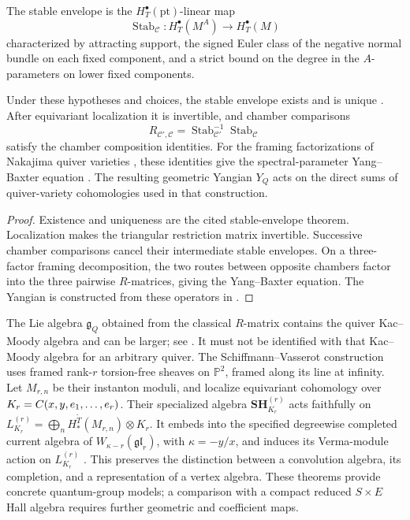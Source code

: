 \begin{definition}
\label{def:stable-envelope}
The stable envelope is the $H_T^\bullet(\mathrm{pt})$-linear map
\[
 \operatorname{Stab}_{\mathcal C}:
 H_T^\bullet(M^A)\longrightarrow H_T^\bullet(M)
\]
characterized by attracting support, the signed Euler class of the
negative normal bundle on each fixed component, and a strict bound
on the degree in the $A$-parameters on lower fixed components.
\end{definition}

\begin{theorem}
\label{thm:maulik-okounkov}
Under these hypotheses and choices, the stable envelope exists and
is unique \cite[Theorem~3.3.4]{MaulikOkounkov}. After equivariant
localization it is invertible, and chamber comparisons
\[
 R_{\mathcal C',\mathcal C}
 =\operatorname{Stab}_{\mathcal C'}^{-1}
       \operatorname{Stab}_{\mathcal C}
\]
satisfy the chamber composition identities. For the framing
factorizations of Nakajima quiver varieties
\cite{Nakajima1994,Nakajima1998}, these identities give
the spectral-parameter Yang--Baxter equation
\cite[\S4.1.8--9]{MaulikOkounkov}.
The resulting geometric Yangian $Y_Q$ acts on the direct sums of
quiver-variety cohomologies used in that construction.
\end{theorem}

\begin{proof}
Existence and uniqueness are the cited stable-envelope theorem.
Localization makes the triangular restriction matrix invertible.
Successive chamber comparisons cancel their intermediate stable
envelopes. On a three-factor framing decomposition, the two routes
between opposite chambers factor into the three pairwise
$R$-matrices, giving the Yang--Baxter equation. The Yangian is
constructed from these operators in
\cite[Chapters~5--6]{MaulikOkounkov}.
\end{proof}

The Lie algebra $\mathfrak g_Q$ obtained from the classical
$R$-matrix contains the quiver Kac--Moody algebra and can be larger;
see \cite[\S1.2.8]{MaulikOkounkov}. It must not be identified with
that Kac--Moody algebra for an arbitrary quiver. The
Schiffmann--Vasserot construction uses framed rank-$r$ torsion-free
sheaves on $\mathbb P^2$, framed along its line at infinity.
Let $M_{r,n}$ be their instanton moduli, and localize equivariant
cohomology over $K_r=C(x,y,e_1,\ldots,e_r)$. Their specialized
algebra $\mathbf{SH}^{(r)}_{K_r}$ acts faithfully on
$L^{(r)}_{K_r}=\bigoplus_n H_*^{\widetilde T}(M_{r,n})\otimes K_r$.
It embeds into the specified degreewise completed current algebra
of $W_{\kappa-r}(\mathfrak{gl}_r)$, with $\kappa=-y/x$, and
induces its Verma-module action on $L^{(r)}_{K_r}$
\cite[Introduction, Theorems~A--C]{SchiffmannVasserot2013}.
This preserves the distinction between a convolution algebra,
its completion, and a representation of a vertex algebra.
These theorems provide concrete quantum-group models; a comparison
with a compact reduced $S\times E$ Hall algebra requires further
geometric and coefficient maps.

